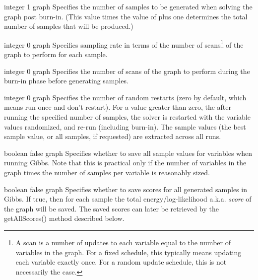 
{integer}
{1}
{graph}
{Specifies the number of samples to be generated when solving the graph post burn-in.  (This value times the value of  plus one determines the total number of samples that will be produced.)}


{integer}
{0}
{graph}
{Specifies sampling rate in terms of the number of scans\footnote{A scan is a number of updates to each variable equal to the number of variables in the graph.  For a fixed schedule, this typically means updating each variable exactly once.  For a random update schedule, this is not necessarily the case.} of the graph to perform for each sample.}



{integer}
{0}
{graph}
{Specifies the number of scans of the graph to perform during the burn-in phase before generating samples.}


{integer}
{0}
{graph}
{Specifies the number of random restarts (zero by default, which means run once and don't restart). For a value greater than zero, the after running the specified number of samples, the solver is restarted with the variable values randomized, and re-run (including burn-in).  The sample values (the best sample value, or all samples, if requested) are extracted across all runs.
}


{boolean}
{false}
{graph}
{Specifies whether to save all sample values for variables when running Gibbs. Note that this is practical only if the number of variables in the graph times the number of samples per variable is reasonably sized.}


{boolean}
{false}
{graph}
{Specifies whether to save scores for all generated samples in Gibbs. If true, then for each sample the total energy/log-likelihood a.k.a. \emph{score} of the graph will be saved. The saved scores can later be retrieved by the getAllScores() method described below.}

